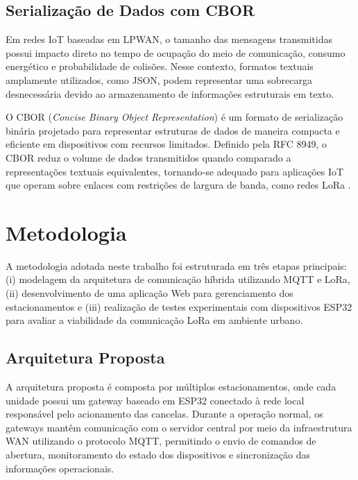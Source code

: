 \documentclass[
article,            %
11pt,               %
twoside,            %
a4paper,            %
section=TITLE,      %
onecolumn,          %
english,            %
brazil,             %
sumario=tradicional
]{abntex2}
\begin{document}
\subsection{Serialização de Dados com CBOR}

Em redes IoT baseadas em LPWAN, o tamanho das mensagens transmitidas possui impacto direto no tempo de ocupação do meio de comunicação, consumo energético e probabilidade de colisões. Nesse contexto, formatos textuais amplamente utilizados, como JSON, podem representar uma sobrecarga desnecessária devido ao armazenamento de informações estruturais em texto.

O CBOR (\textit{Concise Binary Object Representation}) é um formato de serialização binária projetado para representar estruturas de dados de maneira compacta e eficiente em dispositivos com recursos limitados. Definido pela RFC 8949, o CBOR reduz o volume de dados transmitidos quando comparado a representações textuais equivalentes, tornando-se adequado para aplicações IoT que operam sobre enlaces com restrições de largura de banda, como redes LoRa \cite{RFC8949}.

\section{Metodologia}

A metodologia adotada neste trabalho foi estruturada em três etapas principais: (i) modelagem da arquitetura de comunicação híbrida utilizando MQTT e LoRa, (ii) desenvolvimento de uma aplicação Web para gerenciamento dos estacionamentos e (iii) realização de testes experimentais com dispositivos ESP32 para avaliar a viabilidade da comunicação LoRa em ambiente urbano.

\subsection{Arquitetura Proposta}

A arquitetura proposta é composta por múltiplos estacionamentos, onde cada unidade possui um gateway baseado em ESP32 conectado à rede local responsável pelo acionamento das cancelas. Durante a operação normal, os gateways mantêm comunicação com o servidor central por meio da infraestrutura WAN utilizando o protocolo MQTT, permitindo o envio de comandos de abertura, monitoramento do estado dos dispositivos e sincronização das informações operacionais.
\end{document}

